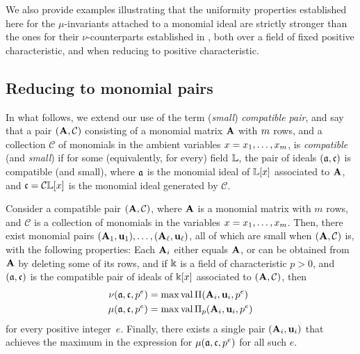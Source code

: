 \documentclass{amsart}
\begin{document}

We also provide examples illustrating that the uniformity properties established here for the $\mu$-invariants attached to a monomial ideal are strictly stronger than the ones for their $\nu$-counterparts established in \loccit, both over a field of fixed positive characteristic, and when reducing to positive characteristic.  

\subsection{Reducing to monomial pairs}

In what follows, we extend our use of the term (\emph{small}) \emph{compatible pair}, and say that a pair $(\mathbf{A}, \mathcal{C})$ consisting of a monomial matrix $\mathbf{A}$ with $m$ rows, and a collection $\mathcal{C}$ of monomials in the ambient variables $x = x_1, \ldots, x_{m}$, is \emph{compatible} (and \emph{small}) if for some (equivalently, for every) field $\mathbb{L}$, the pair of ideals $(\mathfrak{a}, \mathfrak{c})$ is  compatible (and small),  where $\mathfrak{a}$ is the monomial ideal of $\mathbb{L}[x]$ associated to $\mathbf{A}$, and $\mathfrak{c} = \mathcal{C} \mathbb{L}[x]$ is the monomial ideal generated by $\mathcal{C}$.

\begin{theorem}
\label{reduce to diagonal general: T}
Consider a compatible pair $(\mathbf{A}, \mathcal{C})$, where $\mathbf{A}$ is a monomial matrix with $m$ rows, and $\mathcal{C}$ is a collection of monomials in the variables $x = x_1, \ldots, x_m$.    Then, there exist monomial pairs $(\mathbf{A}_1, \mathbf{u}_1), \ldots, (\mathbf{A}_{\ell}, \mathbf{u}_{\ell})$, all of which are small when $(\mathbf{A}, \mathcal{C})$ is, with the following properties\textup:  Each $\mathbf{A}_i$ either equals $\mathbf{A}$, or can be obtained from $\mathbf{A}$ by deleting some of its rows, and if $\Bbbk$ is a field of characteristic $p>0$, and $(\mathfrak{a}, \mathfrak{c})$ is the compatible pair of ideals of $\Bbbk[x]$ associated to $(\mathbf{A}, \mathcal{C})$, then 
\begin{align*}
\nu(\mathfrak{a}, \mathfrak{c}, p^e) & = \max  \operatorname{val} \Pi(\mathbf{A}_i, \mathbf{u}_i, p^e)  \\ 
\mu(\mathfrak{a}, \mathfrak{c}, p^e) & = \max  \operatorname{val} \Pi_p(\mathbf{A}_i, \mathbf{u}_i, p^e) 
\end{align*}
for every positive integer~$e$.  Finally, there exists a single pair $(\mathbf{A}_i, \mathbf{u}_i)$ that achieves the maximum in the expression for $\mu(\mathfrak{a}, \mathfrak{c}, p^e)$ for all such $e$.
\end{theorem}
\end{document}
